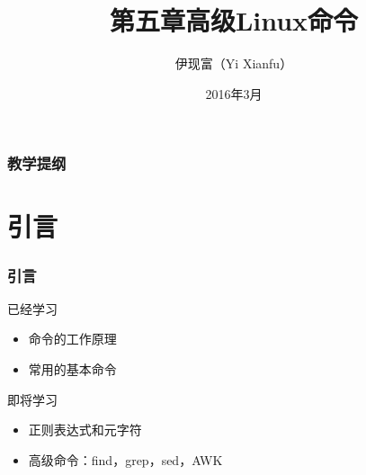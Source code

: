 



\title[高级Linux命令]{第五章\quad 高级Linux命令}
\author[Yixf]{伊现富（Yi Xianfu）}
\date{2016年3月}


\begin{frame}
  \titlepage
\end{frame}

\begin{frame}[plain,label=current]
  \frametitle{教学提纲}
  \setcounter{tocdepth}{3}
  \begin{multicols}{2}
    \tableofcontents
  \end{multicols}
\end{frame}


\section{引言}
\begin{frame}
  \frametitle{引言}
  \begin{block}{已经学习}
    \begin{itemize}
      \item 命令的工作原理
      \item 常用的基本命令
    \end{itemize}
  \end{block}
  \pause
  \begin{block}{即将学习}
    \begin{itemize}
      \item 正则表达式和元字符
      \item 高级命令：find，grep，sed，AWK
    \end{itemize}
  \end{block}
\end{frame}

